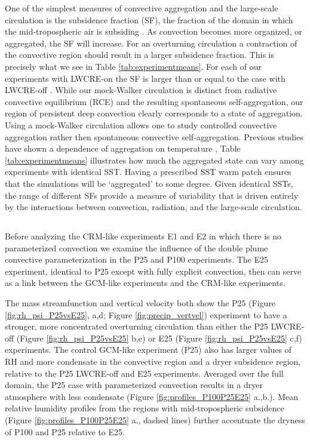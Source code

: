\documentclass[draft]{agujournal2019}
\begin{document}
One of the simplest measures of convective aggregation and the large-scale circulation is the subsidence fraction (SF), the fraction of the domain 
in which the mid-tropospheric air is subsiding \cite{Coppin_Bony_2015}.  
As convection becomes more organized, or aggregated, the SF will increase.  For an overturning circulation a contraction of the convective 
region should result in a larger subsidence fraction.  
This is precisely what we see in Table \ref{tab:experimentmeans}.  For each of our experiments with LWCRE-on the SF is larger than 
or equal to the case with LWCRE-off .   
While our mock-Walker circulation is distinct from radiative convective equilibrium (RCE) and the resulting spontaneous self-aggregation, our 
region of persistent deep convection clearly corresponds to a state of aggregation. 
Using a mock-Walker circulation allows one to study controlled convective aggregation rather then spontaneous convective self-aggregation. 
Previous studies have shown a dependence of aggregation 
on temperature \cite{Khairoutdinov2010, Wing2014, Cronin2017}, Table \ref{tab:experimentmeans} illustrates how much the aggregated 
state can vary among experiments with identical SST.  Having a prescribed SST warm 
patch ensures that the simulations will be `aggregated' to some degree.  
Given identical SSTs, the  range of different SFs provide a measure of variability that is driven entirely by the interactions between 
convection, radiation, and the large-scale circulation. 


\subsection{}

Before analyzing the CRM-like experiments E1 and E2 in which there is no parameterized convection we examine the influence of 
the double plume convective parameterization in the P25 and P100 experiments.  The E25 experiment, identical to P25 except with 
fully explicit convection, then can serve as a link between the GCM-like experiments and the CRM-like experiments.  

The mass streamfunction and vertical velocity both show the P25 (Figure \ref{fig:rh_psi_P25vsE25}, a,d; Figure \ref{fig:precip_vertvel}) experiment to have 
a stronger, more concentrated overturning circulation than either the P25 LWCRE-off (Figure \ref{fig:rh_psi_P25vsE25} b,e) or E25 (Figure 
\ref{fig:rh_psi_P25vsE25} c,f) experiments.   The control GCM-like experiment (P25) also has larger values of RH and more condensate in the convective
region and a dryer subsidence region, relative to the P25 LWCRE-off and E25 experiments. 
Averaged over the full domain, the P25 case with parameterized convection results in a dryer atmosphere with less condensate 
(Figure \ref{fig:profiles_P100P25E25} a.,b.).  Mean relative humidity profiles from the regions with 
mid-tropospheric subsidence (Figure \ref{fig:profiles_P100P25E25} a., dashed lines) further accentuate the dryness of P100 and P25 relative
to E25.   
\end{document}
